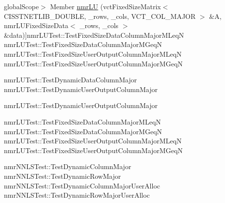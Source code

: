 \begin{DoxyRefList}
global\+Scope$>$ Member \hyperlink{nmr_l_u_8h_a66bf403c705953a781e940cf1b674d5f}{nmr\+L\+U} (vct\+Fixed\+Size\+Matrix$<$ C\+I\+S\+S\+T\+N\+E\+T\+L\+I\+B\+\_\+\+D\+O\+U\+B\+L\+E, \+\_\+rows, \+\_\+cols, V\+C\+T\+\_\+\+C\+O\+L\+\_\+\+M\+A\+J\+O\+R $>$ \&A, nmr\+L\+U\+Fixed\+Size\+Data$<$ \+\_\+rows, \+\_\+cols $>$ \&data)]nmr\+L\+U\+Test\+::\+Test\+Fixed\+Size\+Data\+Column\+Major\+M\+Leq\+N nmr\+L\+U\+Test\+::\+Test\+Fixed\+Size\+Data\+Column\+Major\+M\+Geq\+N nmr\+L\+U\+Test\+::\+Test\+Fixed\+Size\+User\+Output\+Column\+Major\+M\+Leq\+N nmr\+L\+U\+Test\+::\+Test\+Fixed\+Size\+User\+Output\+Column\+Major\+M\+Geq\+N  
\item[\label{test__test000005}%
\hypertarget{test__test000005}{}%
global\+Scope$>$ Member \hyperlink{nmr_l_u_8h_a1c368f088de9642bd4dc6f448e4b1e24}{nmr\+L\+U} (vct\+Dynamic\+Matrix\+Base$<$ \+\_\+matrix\+Owner\+Type, C\+I\+S\+S\+T\+N\+E\+T\+L\+I\+B\+\_\+\+D\+O\+U\+B\+L\+E $>$ \&A, \hyperlink{classnmr_l_u_dynamic_data}{nmr\+L\+U\+Dynamic\+Data} \&data)]nmr\+L\+U\+Test\+::\+Test\+Dynamic\+Data\+Column\+Major nmr\+L\+U\+Test\+::\+Test\+Dynamic\+User\+Output\+Column\+Major 
\item[\label{test__test000006}%
\hypertarget{test__test000006}{}%
global\+Scope$>$ Member \hyperlink{nmr_l_u_8h_aa10afc4fd0a4cbfea2fc0b5e9ae88a15}{nmr\+L\+U} (vct\+Dynamic\+Matrix\+Base$<$ \+\_\+matrix\+Owner\+Type\+A, C\+I\+S\+S\+T\+N\+E\+T\+L\+I\+B\+\_\+\+D\+O\+U\+B\+L\+E $>$ \&A, vct\+Dynamic\+Vector\+Base$<$ \+\_\+vector\+Owner\+Type\+Pivot\+Indices, C\+I\+S\+S\+T\+N\+E\+T\+L\+I\+B\+\_\+\+I\+N\+T\+E\+G\+E\+R $>$ \&pivot\+Indices)]nmr\+L\+U\+Test\+::\+Test\+Dynamic\+User\+Output\+Column\+Major  
\item[\label{test__test000007}%
\hypertarget{test__test000007}{}%
global\+Scope$>$ Member \hyperlink{nmr_l_u_8h_a252973f76de9a91c9a583cf48e155bd5}{nmr\+L\+U} (vct\+Fixed\+Size\+Matrix$<$ C\+I\+S\+S\+T\+N\+E\+T\+L\+I\+B\+\_\+\+D\+O\+U\+B\+L\+E, \+\_\+rows, \+\_\+cols, V\+C\+T\+\_\+\+C\+O\+L\+\_\+\+M\+A\+J\+O\+R $>$ \&A, vct\+Fixed\+Size\+Vector$<$ C\+I\+S\+S\+T\+N\+E\+T\+L\+I\+B\+\_\+\+I\+N\+T\+E\+G\+E\+R, \+\_\+minmn $>$ \&pivot\+Indices)]nmr\+L\+U\+Test\+::\+Test\+Fixed\+Size\+Data\+Column\+Major\+M\+Leq\+N nmr\+L\+U\+Test\+::\+Test\+Fixed\+Size\+Data\+Column\+Major\+M\+Geq\+N nmr\+L\+U\+Test\+::\+Test\+Fixed\+Size\+User\+Output\+Column\+Major\+M\+Leq\+N nmr\+L\+U\+Test\+::\+Test\+Fixed\+Size\+User\+Output\+Column\+Major\+M\+Geq\+N  
\item[\label{test__test000009}%
\hypertarget{test__test000009}{}%
global\+Scope$>$ Member \hyperlink{nmr_n_n_l_s_8h_a66392d56623e80ae0b6962a40d6da77c}{nmr\+N\+N\+L\+S} (vct\+Dynamic\+Matrix\+Base$<$ \+\_\+matrix\+Owner\+Type, C\+I\+S\+S\+T\+N\+E\+T\+L\+I\+B\+\_\+\+D\+O\+U\+B\+L\+E $>$ \&A, \hyperlink{classnmr_n_n_l_s_dynamic_data}{nmr\+N\+N\+L\+S\+Dynamic\+Data} \&data)]nmr\+N\+N\+L\+S\+Test\+::\+Test\+Dynamic\+Column\+Major nmr\+N\+N\+L\+S\+Test\+::\+Test\+Dynamic\+Row\+Major nmr\+N\+N\+L\+S\+Test\+::\+Test\+Dynamic\+Column\+Major\+User\+Alloc nmr\+N\+N\+L\+S\+Test\+::\+Test\+Dynamic\+Row\+Major\+User\+Alloc  

\end{DoxyRefList}
